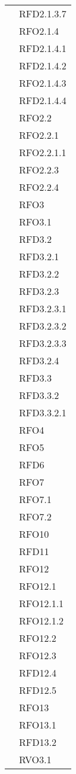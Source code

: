 \begin{longtable}{|>{\centering}m{10cm}|m{3cm}<{\centering}|}
& RFD2.1.3.7\\
& RFO2.1.4\\
& RFD2.1.4.1\\
& RFD2.1.4.2\\
& RFO2.1.4.3\\
& RFD2.1.4.4\\
& RFO2.2\\
& RFO2.2.1\\
& RFO2.2.1.1\\
& RFO2.2.3\\
& RFO2.2.4\\
& RFO3\\
& RFO3.1\\
& RFD3.2\\
& RFD3.2.1\\
& RFD3.2.2\\
& RFD3.2.3\\
& RFD3.2.3.1\\
& RFD3.2.3.2\\
& RFD3.2.3.3\\
& RFD3.2.4\\
& RFD3.3\\
& RFD3.3.2\\
& RFD3.3.2.1\\
& RFO4\\
& RFO5\\
& RFD6\\
& RFO7\\
& RFO7.1\\
& RFO7.2\\
& RFO10\\
& RFD11\\
& RFO12\\
& RFO12.1\\
& RFO12.1.1\\
& RFO12.1.2\\
& RFO12.2\\
& RFO12.3\\
& RFD12.4\\
& RFD12.5\\
& RFO13\\
& RFO13.1\\
& RFD13.2\\
& RVO3.1\\ \hline


\end{longtable}
